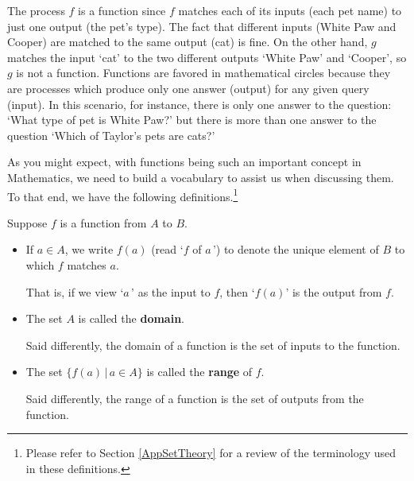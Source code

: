 \documentclass{ximera}
\begin{document}


The process $f$ is a function since $f$ matches each of its inputs (each pet name) to just one output (the pet's type).   The fact that different inputs (White Paw and Cooper) are matched to the same output (cat) is fine.   On the other hand, $g$ matches the input `cat' to the two different outputs  `White Paw' and `Cooper', so $g$ is not a function.    Functions are favored in mathematical circles because they are processes which produce only one answer (output) for any given query (input).  In this scenario, for instance, there is only one answer to the question: `What type of pet is White Paw?' but there is more than one answer to the question `Which of Taylor's pets are cats?'  

As you might expect, with functions being such an important concept in Mathematics, we need to build a vocabulary to assist us when discussing them.  To that end, we have the following definitions.\footnote{Please refer to Section \ref{AppSetTheory} for a review of the terminology used in these definitions.}

\begin{definition}\label{domainrangedefns}

Suppose $f$ is a function from $A$ to $B$.

\begin{itemize}

\item If $a \in A$, we write $f(a)$ (read `$f$ of $a\, $') to denote the unique element of $B$ to which $f$ matches $a$.  

That is, if we view `$a\,$' as the input to $f$, then `$f(a)$' is the output from $f$.

\item  The set $A$ is called the  \textbf{domain}.  

Said differently, the domain of a function is the set of inputs to the function.

\item  The set $\{ f(a) \, | \, a \in A \}$ is called the    \textbf{range} of $f$. 

Said differently, the range of a function is the set of outputs from the function.

\end{itemize}


\end{definition}
\end{document}

